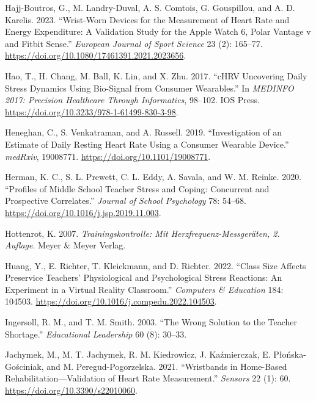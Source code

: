 \documentclass[preprint,
3p]{elsarticle} %
\newlength{\cslhangindent}
\newenvironment{CSLReferences}[2] %
 {\begin{list}{}{%
  \setlength{\itemindent}{0pt}
  \setlength{\leftmargin}{0pt}
  \setlength{\parsep}{0pt}
  \ifodd #1
   \setlength{\leftmargin}{\cslhangindent}
   \setlength{\itemindent}{-1\cslhangindent}
  \fi
  \setlength{\itemsep}{#2\baselineskip}}}
 {\end{list}}
\begin{document}
\begin{CSLReferences}{1}{0}
Hajj-Boutros, G., M. Landry-Duval, A. S. Comtois, G. Gouspillou, and A.
D. Karelis. 2023. {``Wrist-Worn Devices for the Measurement of Heart
Rate and Energy Expenditure: A Validation Study for the Apple Watch 6,
Polar Vantage v and Fitbit Sense.''} \emph{European Journal of Sport
Science} 23 (2): 165--77.
\url{https://doi.org/10.1080/17461391.2021.2023656}.

Hao, T., H. Chang, M. Ball, K. Lin, and X. Zhu. 2017. {``cHRV Uncovering
Daily Stress Dynamics Using Bio-Signal from Consumer Wearables.''} In
\emph{MEDINFO 2017: Precision Healthcare Through Informatics}, 98--102.
IOS Press. \url{https://doi.org/10.3233/978-1-61499-830-3-98}.

Heneghan, C., S. Venkatraman, and A. Russell. 2019. {``Investigation of
an Estimate of Daily Resting Heart Rate Using a Consumer Wearable
Device.''} \emph{medRxiv}, 19008771.
\url{https://doi.org/10.1101/19008771}.

Herman, K. C., S. L. Prewett, C. L. Eddy, A. Savala, and W. M. Reinke.
2020. {``Profiles of Middle School Teacher Stress and Coping: Concurrent
and Prospective Correlates.''} \emph{Journal of School Psychology} 78:
54--68. \url{https://doi.org/10.1016/j.jsp.2019.11.003}.

Hottenrot, K. 2007. \emph{Trainingskontrolle: Mit
Herzfrequenz-Messgeräten, 2. Auflage}. Meyer \& Meyer Verlag.

Huang, Y., E. Richter, T. Kleickmann, and D. Richter. 2022. {``Class
Size Affects Preservice Teachers' Physiological and Psychological Stress
Reactions: An Experiment in a Virtual Reality Classroom.''}
\emph{Computers \& Education} 184: 104503.
\url{https://doi.org/10.1016/j.compedu.2022.104503}.

Ingersoll, R. M., and T. M. Smith. 2003. {``The Wrong Solution to the
Teacher Shortage.''} \emph{Educational Leadership} 60 (8): 30--33.

Jachymek, M., M. T. Jachymek, R. M. Kiedrowicz, J. Kaźmierczak, E.
Płońska-Gościniak, and M. Peregud-Pogorzelska. 2021. {``Wristbands in
Home-Based Rehabilitation---Validation of Heart Rate Measurement.''}
\emph{Sensors} 22 (1): 60. \url{https://doi.org/10.3390/s22010060}.


\end{CSLReferences}
\end{document}
